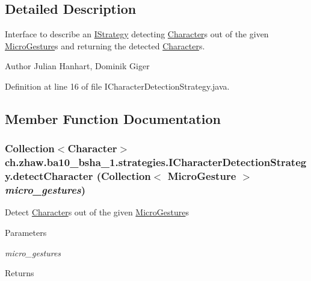 \subsection{Detailed Description}
Interface to describe an \hyperlink{interfacech_1_1zhaw_1_1ba10__bsha__1_1_1strategies_1_1IStrategy}{IStrategy} detecting \hyperlink{classch_1_1zhaw_1_1ba10__bsha__1_1_1Character}{Character}s out of the given \hyperlink{}{MicroGesture}s and returning the detected \hyperlink{classch_1_1zhaw_1_1ba10__bsha__1_1_1Character}{Character}s.

\begin{DoxyAuthor}{Author}
Julian Hanhart, Dominik Giger 
\end{DoxyAuthor}


Definition at line 16 of file ICharacterDetectionStrategy.java.

\subsection{Member Function Documentation}
\hypertarget{interfacech_1_1zhaw_1_1ba10__bsha__1_1_1strategies_1_1ICharacterDetectionStrategy_a994429a274e75c471d18aca69dce2c1d}{
\subsubsection[{detectCharacter}]{\setlength{\rightskip}{0pt plus 5cm}Collection$<${\bf Character}$>$ ch.zhaw.ba10\_\-bsha\_\-1.strategies.ICharacterDetectionStrategy.detectCharacter (Collection$<$ {\bf MicroGesture} $>$ {\em micro\_\-gestures})}}
\label{interfacech_1_1zhaw_1_1ba10__bsha__1_1_1strategies_1_1ICharacterDetectionStrategy_a994429a274e75c471d18aca69dce2c1d}
Detect \hyperlink{classch_1_1zhaw_1_1ba10__bsha__1_1_1Character}{Character}s out of the given \hyperlink{}{MicroGesture}s


\begin{DoxyParams}{Parameters}
\item[{\em micro\_\-gestures}]\end{DoxyParams}
\begin{DoxyReturn}{Returns}

\end{DoxyReturn}


